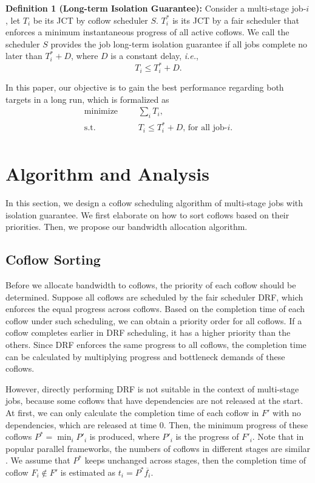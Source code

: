 \documentclass[10pt, conference, letterpaper]{IEEEtran}
\begin{document}
\textbf{Definition 1 (Long-term Isolation Guarantee):} Consider a multi-stage job-$i$, let $T_i$ be its JCT by coflow scheduler $S$. $T_i^*$ is its JCT by a fair scheduler that enforces a minimum instantaneous progress of all active coflows. We call the scheduler $S$ provides the job long-term isolation guarantee if all jobs complete no later than $T_i^* + D$, where $D$ is a constant delay, \emph{i.e.},
\begin{equation}
	T_i \leq T_i^* + D.
\end{equation}

In this paper, our objective is to gain the best performance regarding both targets in a long run, which is formalized as
\begin{equation}
	\begin{aligned}
		\text{minimize} & & &\sum\limits_{i}T_i,\\
		\text{s.t.} & & &T_i \leq T_i^* + D \text{, for all job-}i.\\
	\end{aligned}
\end{equation}

\section{Algorithm and Analysis}\label{algorithm}
In this section, we design a coflow scheduling algorithm of multi-stage jobs with isolation guarantee. We first elaborate on how to sort coflows based on their priorities. Then, we propose our bandwidth allocation algorithm.

\subsection{Coflow Sorting}
Before we allocate bandwidth to coflows, the priority of each coflow should be determined. Suppose all coflows are scheduled by the fair scheduler DRF, which enforces the equal progress across coflows\cite{DRF,HUG}. Based on the completion time of each coflow under such scheduling, we can obtain a priority order for all coflows. If a coflow completes earlier in DRF scheduling, it has a higher priority than the others. Since DRF enforces the same progress to all coflows, the completion time can be calculated by multiplying progress and bottleneck demands of these coflows.

However, directly performing DRF is not suitable in the context of multi-stage jobs, because some coflows that have dependencies are not released at the start. At first, we can only calculate the completion time of each coflow in $F'$ with no dependencies, which are released at time 0. Then, the minimum progress of these coflows $P^* = \min_iP'_i$ is produced, where $P'_i$ is the progress of $F'_i$. Note that in popular parallel frameworks, the numbers of coflows in different stages are similar \cite{Spark,coflowsurvey}. We assume that $P^*$ keeps unchanged across stages, then the completion time of coflow $F_i \notin F'$ is estimated as $t_i = P^*\overline{f_i}$.
\end{document}
